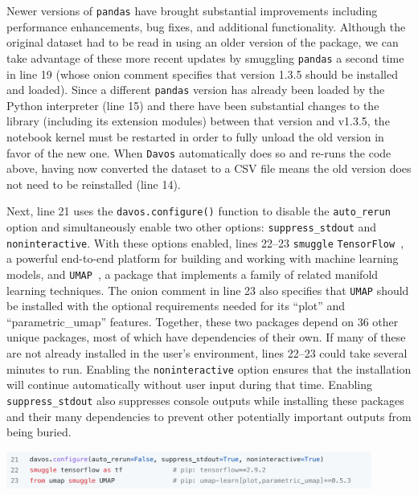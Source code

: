 \documentclass[preprint,12pt,a4paper]{elsarticle}
\begin{document}
Newer versions of \texttt{pandas} have brought substantial improvements
including performance enhancements, bug fixes, and additional functionality. Although
the original dataset had to be read in using an older version of the package,
we can take advantage of these more recent updates by smuggling \texttt{pandas}
a second time in line 19 (whose onion comment specifies that version 1.3.5
should be installed and loaded). Since a different \texttt{pandas} version
has already been loaded by the Python interpreter (line 15) and there have been
substantial changes to the library (including its extension modules)
between that version and v1.3.5, the notebook
kernel must be restarted in order to fully unload the old version in favor of
the new one.
When \texttt{Davos} automatically does so and re-runs the code above, having now converted the dataset to a CSV file means the old version does not need to be reinstalled (line 14).

Next, line 21 uses the \texttt{davos.configure()} function to disable
the \texttt{auto\_rerun} option and simultaneously enable two other
options: \texttt{suppress\_stdout} and \texttt{noninteractive}. With
these options enabled, lines 22--23 \texttt{smuggle}
\texttt{TensorFlow}~\cite{AbadEtal15}, a powerful end-to-end platform
for building and working with machine learning models, and
\texttt{UMAP}~\cite{McInEtal18}, a package that implements a family
of related manifold learning techniques. The onion comment in line 23
also specifies that \texttt{UMAP} should be installed with the
optional requirements needed for its ``plot'' and ``parametric\_umap''
features. Together, these two packages depend on 36 other unique
packages, most of which have dependencies of their own. If many of
these are not already installed in the user's environment, lines
22--23 could take several minutes to run. Enabling the
\texttt{noninteractive} option ensures that the installation will
continue automatically without user input during that time. Enabling
\texttt{suppress\_stdout} also suppresses console outputs while installing
these packages and their many dependencies to prevent other potentially important outputs from being buried.
\begin{center}
\includegraphics[width=0.9\textwidth]{figs/example5}
\end{center}
\end{document}
